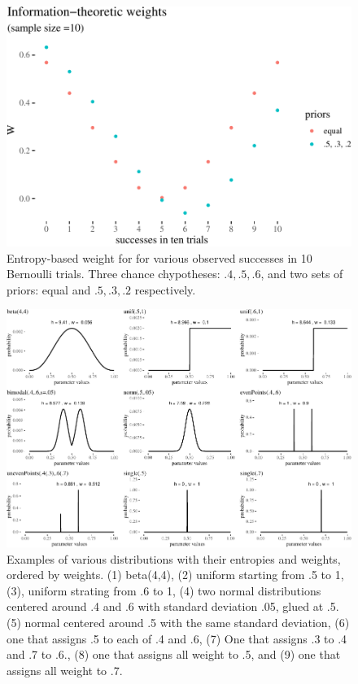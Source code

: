 \documentclass[
  10pt,
  dvipsnames,enabledeprecatedfontcommands]{scrartcl}
\begin{document}
\begin{figure}

\begin{center}\includegraphics[width=0.7\linewidth]{chapter-outline_files/figure-latex/entropyJoyceExamplePlot10-1} \end{center}

\caption{Entropy-based weight for for various observed successes in 10 Bernoulli trials. Three chance chypotheses: $.4, .5, .6$, and two sets of priors: equal and $.5, .3, .2$ respectively.}
\label{fig:entropyJoyceExamplePlot}
\end{figure}

\begin{figure}[H]

\begin{center}\includegraphics[width=1\linewidth]{chapter-outline_files/figure-latex/fig:weightsWeird-1} \end{center}
\caption{Examples of various distributions with their entropies and weights, ordered by weights. (1) beta(4,4), (2) uniform starting from .5 to 1, (3), uniform strating from .6 to 1, (4) two normal distributions centered around .4 and .6 with standard deviation .05, glued at .5. (5) normal centered around .5 with the same standard deviation, (6) one that assigns .5 to each of .4  and .6, (7) One that assigns .3 to .4 and .7 to .6., (8) one that assigns all weight to .5, and (9) one that assigns all weight to .7.}

\label{fig:weightsWeird}
\end{figure}
\end{document}
